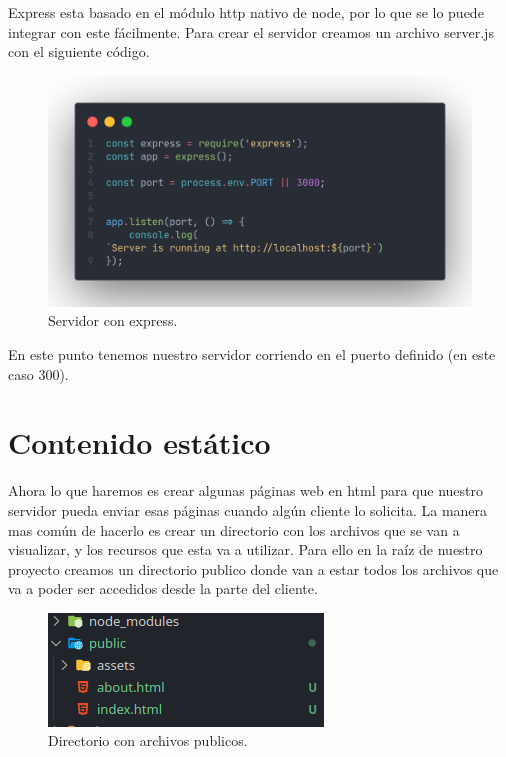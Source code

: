 \documentclass[12pt]{article}
\begin{document}
Express esta basado en el módulo http nativo de node, por lo que se lo puede integrar con este fácilmente. Para crear el servidor creamos un archivo server.js con el siguiente código.

\begin{figure}[H]
  \centering
  \includegraphics[scale=.3]{assets/images/express-server.png}
  \caption{Servidor con express.}
\end{figure}

En este punto tenemos nuestro servidor corriendo en el puerto definido (en este caso 300).

\section{Contenido estático}

Ahora lo que haremos es crear algunas páginas web en html para que nuestro servidor pueda enviar esas páginas cuando algún cliente lo solicita. La manera mas común de hacerlo es crear un directorio con los archivos que se van a visualizar, y los recursos que esta va a utilizar.
Para ello en la raíz de nuestro proyecto creamos un directorio publico donde van a estar todos los archivos que va a poder ser accedidos desde la parte del cliente.

\begin{figure}[H]
  \centering
  \includegraphics{assets/images/static.png}
  \caption{Directorio con archivos publicos.}
\end{figure}
\end{document}

